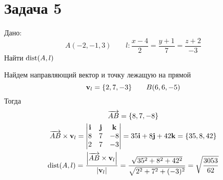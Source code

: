 \documentclass[12pt, oneside]{memoir}
\begin{document}
\section*{Задача 5}
Дано: \[A(-2,-1,3) \qquad l: \frac{x-4}{2} = \frac{y+1}{7} = \frac{z+2}{-3}\]
Найти $\operatorname{dist}(A, l)$

Найдем направляющий вектор и точку лежащую на прямой
\[\mathbf{v}_l = \{2, 7, -3\} \qquad B(6,6,-5)\]
Тогда
\begin{gather*}
    \overrightarrow{AB} = \{8, 7, -8\}\\
    \overrightarrow{AB} \times \mathbf{v}_l = \begin{vmatrix}
        \mathbf{i} & \mathbf{j} & \mathbf{k} \\
        8   & 7   & -8  \\
        2   & 7   & -3
    \end{vmatrix} = 35 \mathbf{i} + 8 \mathbf{j} + 42 \mathbf{k} = \{35, 8, 42\}\\
    \operatorname{dist}(A, l) = \frac{\left|\overrightarrow{AB} \times \mathbf{v}_l \right|}{|\mathbf{v}_l|} =
    \frac{\sqrt{35^2 + 8^2 + 42^2}}{\sqrt{2^2 + 7^2 + (-3)^2}} = \sqrt{\frac{3053}{62}}
\end{gather*}
\end{document}
